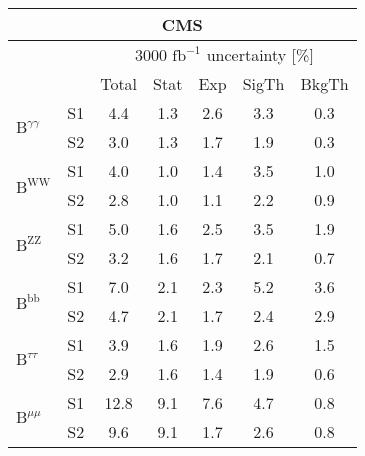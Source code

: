 \begin{tabular}{@{} l c c@{\hskip 0.15in} c c c c @{}}
 \hline
   \multicolumn{7}{c}{CMS}\\
 \hline
  &  & \multicolumn{5}{c}{3000 $\text{fb}^{-1}$ uncertainty [\%]} \\
  &  & Total & Stat & Exp & SigTh & BkgTh \\
 \hline
\multirow{2}{*}{$\mathrm{B}^{\gamma\gamma}$} & S1  & 4.4& 1.3 & 2.6 & 3.3 & 0.3  \\[1pt]
                        & S2  & 3.0& 1.3 & 1.7 & 1.9 & 0.3  \\[4pt]
\multirow{2}{*}{$\mathrm{B}^{\mathrm{WW}}$} & S1  & 4.0& 1.0 & 1.4 & 3.5 & 1.0  \\[1pt]
                        & S2  & 2.8& 1.0 & 1.1 & 2.2 & 0.9  \\[4pt]
\multirow{2}{*}{$\mathrm{B}^{\mathrm{ZZ}}$} & S1  & 5.0& 1.6 & 2.5 & 3.5 & 1.9  \\[1pt]
                        & S2  & 3.2& 1.6 & 1.7 & 2.1 & 0.7  \\[4pt]
\multirow{2}{*}{$\mathrm{B}^{\mathrm{bb}}$} & S1  & 7.0& 2.1 & 2.3 & 5.2 & 3.6  \\[1pt]
                        & S2  & 4.7& 2.1 & 1.7 & 2.4 & 2.9  \\[4pt]
\multirow{2}{*}{$\mathrm{B}^{\tau\tau }$} & S1  & 3.9& 1.6 & 1.9 & 2.6 & 1.5  \\[1pt]
                        & S2  & 2.9& 1.6 & 1.4 & 1.9 & 0.6  \\[4pt]
\multirow{2}{*}{$\mathrm{B}^{\mu\mu}$} & S1  & 12.8& 9.1 & 7.6 & 4.7 & 0.8  \\[1pt]
                        & S2  & 9.6& 9.1 & 1.7 & 2.6 & 0.8  \\[4pt]
\hline
\end{tabular}